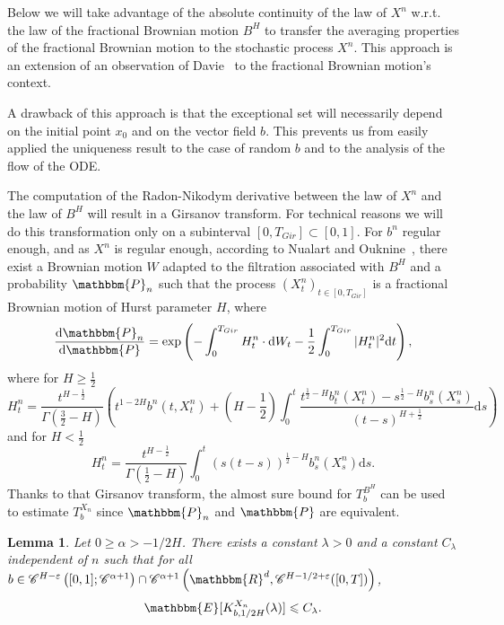 \documentclass[a4paper,11pt]{article}
\newcommand{\mathd}{\mathrm{d}}
\newtheorem{lemma}[theorem]{Lemma}
\newcommand{\CC}{\mathscr C}
\begin{document}
Below we will take advantage of the absolute continuity of the law of $X^{n}$
w.r.t. the law of the fractional Brownian motion $B^{H}$ to transfer the averaging properties of the
fractional Brownian motion to the stochastic process $X^{n}$. This approach is an extension of an
observation of Davie~{\cite{MR2377011}} to the fractional Brownian motion's context.

A drawback of this approach is that the exceptional set will necessarily
depend on the initial point $x_{0}$ and on the vector field $b$. This prevents us
from easily applied the uniqueness result to the case of random $b$ and to the
analysis of the flow of the ODE.

The computation of the Radon-Nikodym derivative between the law of $X^{n}$ and
the law of $B^{H}$ will result in a Girsanov transform. For technical reasons
we will do this transformation only on a subinterval $[0,T_{Gir} ] \subset
[0,1]$. For $b^{n}$ regular enough, and as $X^{n}$ is regular enough,
according to Nualart and Ouknine~{\cite{MR1934157}}, there exist a Brownian
motion $W$ adapted to the filtration associated with $B^{H}$ and a probability
$\mathbbm{P}_{n}$ such that the process $(X^{n}_{t} )_{t \in [0,T_{Gir} ]}$ is
a fractional Brownian motion of Hurst parameter $H$, where
\[ \frac{\mathd \mathbbm{P}_{n}}{\mathd \mathbbm{P}} = \exp   \left( -
   \int_{0}^{T_{Gir}} H_{t}^{n} \cdot \mathd W_{t} - \frac{1}{2} 
   \int_{0}^{T_{Gir}} | H^{n}_{t} |^{2} \mathd t \right), \]
 where for $H \ge \frac{1}{2}$
\[ H_{t}^{n} = \frac{t^{H- \frac{1}{2}}}{\Gamma ( \frac{3}{2} -H)}  \left(
   t^{1-2H} b^{n} (t,X^{n}_{t} )+ \left( H- \frac{1}{2} \right)  \int_{0}^{t}
   \frac{t^{\frac{1}{2} -H} b^{n}_{t} (X^{n}_{t} )-s^{\frac{1}{2} -H}
   b^{n}_{s} (X^{n}_{s} )}{(t-s)^{H+ \frac{1}{2}}} \mathd s \right) \]
and for $H< \frac{1}{2}$
\[ H_{t}^{n} = \frac{t^{H- \frac{1}{2}}}{\Gamma ( \frac{1}{2} -H)} 
   \int_{0}^{t} ( s(t-s) )^{\frac{1}{2} -H} b^{n}_{s} (X^{n}_{s} ) \mathd s. \]
Thanks to that Girsanov transform, the almost sure bound for $T^{B^{H}}_{b}$
can be used to estimate $T^{X_{n}}_{b}$ since $\mathbbm{P}_{n}$ and
$\mathbbm{P}$ are equivalent.

\begin{lemma}
  \label{majoration Qn}Let $0 \geqslant \alpha >-1/2H$. There exists a
  constant $\lambda >0$ and a constant $C_{\lambda}$ independent of $n$ such
  that for all $b \in \CC^{H- \varepsilon} \left( [ 0,1 ] ; \CC^{\alpha +1}
  \right) \cap \CC^{\alpha +1} \left( \mathbbm{R}^{d} , \CC^{H-1/2+
  \varepsilon} ( [ 0,T ] ) \right)$,
  \[ \mathbbm{E} [ K^{X_{n}}_{b,1/2H} ( \lambda ) ] \leqslant C_{\lambda} .\]
\end{lemma}
\end{document}
